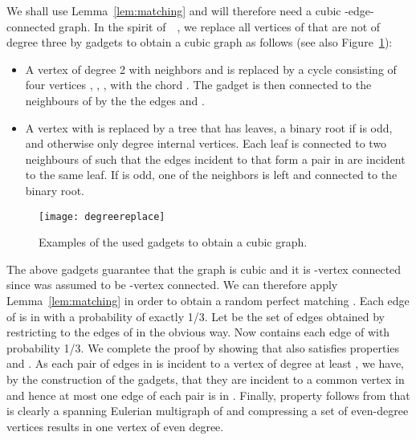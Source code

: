 \documentclass[letterpaper,11pt]{article}
\newenvironment{proof}{\begin{trivlist}
\item[\hskip\labelsep {\bf Proof}.]}{\QED \end{trivlist}}
\newcommand{\QED}{\hfill }
\begin{document}
\begin{proof}
  We shall use Lemma~\ref{lem:matching} and will therefore need a
  cubic -edge-connected graph. In the spirit of~~\cite{FJJ89}, we replace
  all vertices of  that are not of degree three by gadgets to
  obtain a cubic graph  as follows (see also
  Figure~\ref{fig:degreplace}):
\begin{itemize}
\item A vertex  of degree 2 with neighbors  and  is replaced
  by a cycle consisting of four vertices , , , 
  with the chord . The gadget is then connected to the
  neighbours of  by the the edges  and .
    
\item A vertex  with  is replaced by a tree  that
  has  leaves, a binary root if  is odd,
  and otherwise only degree  internal vertices. Each leaf is
  connected to two neighbours of  such that the edges incident to 
  that form a pair in  are incident to the same leaf.  If  is
  odd, one of the neighbors is left and connected to the binary root.
\end{itemize}

\begin{figure}[bt]
\begin{center}
\texttt{[image: degreereplace]}
\end{center}
\caption{Examples of the used gadgets to obtain a cubic graph.}
\label{fig:degreplace}
\end{figure}
The above gadgets guarantee that the graph  is cubic and it is
-vertex connected since  was assumed to be -vertex connected.
We can therefore apply Lemma~\ref{lem:matching} in order to obtain
a random perfect matching . Each edge of  is in  with a
probability of exactly 1/3. Let  be the set of edges obtained by
restricting  to the edges of  in the obvious way. Now 
contains each edge of  with probability
1/3.
We complete the proof by showing that  also satisfies properties
 and .  As each pair of edges in  is incident to a vertex
of degree at least , we have, by the construction of the gadgets,
that they are incident to a common vertex in  and hence at most
one edge of each pair is in . 
Finally, property  follows from that  is clearly a spanning Eulerian
multigraph of  and compressing a set of even-degree vertices results in one vertex of even degree.
\end{proof}
\end{document}
